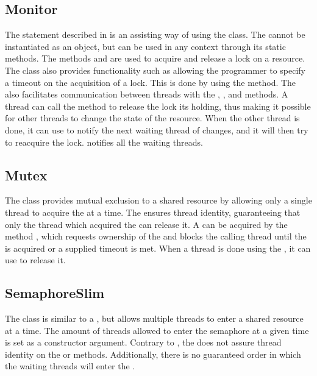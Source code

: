 \subsection{Monitor}
The  statement described in  is an assisting way of using the  class\cite{msdnMonitor}. The  cannot be instantiated as an object, but can be used in any context through its static methods. The methods  and  are used to acquire and release a lock on a resource. The  class also provides functionality such as allowing the programmer to specify a timeout on the acquisition of a lock. This is done by using the  method. The  also facilitates communication between threads with the , , and  methods. A thread can call the  method to release the lock its holding, thus making it possible for other threads to change the state of the resource. When the other thread is done, it can use  to notify the next waiting thread of changes, and it will then try to reacquire the lock.  notifies all the waiting threads.

\subsection{Mutex}
The  class\cite{msdnMutex} provides mutual exclusion to a shared resource by allowing only a single thread to acquire the  at a time. The  ensures thread identity,  guaranteeing that only the thread which acquired the  can release it. A  can be acquired by the method , which requests ownership of the  and blocks the calling thread until the  is acquired or a supplied timeout is met. When a thread is done using the , it can use  to release it.

\subsection{SemaphoreSlim}
The  class\cite{msdnSemaphoreSlim} is similar to a , but allows multiple threads to enter a shared resource at a time. The amount of threads allowed to enter the semaphore at a given time is set as a constructor argument. Contrary to , the  does not assure thread identity on the  or  methods. Additionally, there is no guaranteed order in which the waiting threads will enter the .

